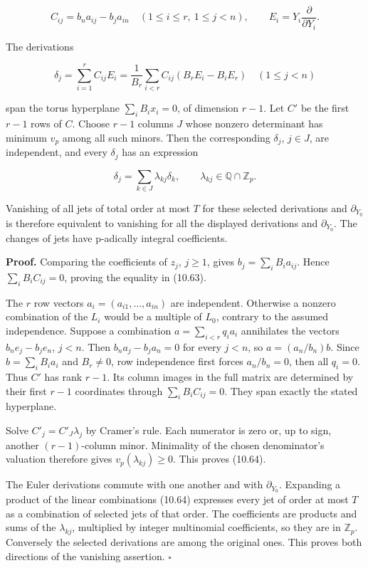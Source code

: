 \documentclass[
  11pt,
  a4paper,
]{article}
\begin{document}
\[
C_{ij}=b_n a_{ij}-b_j a_{in}\quad(1\le i\le r,\ 1\le j<n),
\qquad E_i=Y_i\frac{\partial}{\partial Y_i}.
\tag{10.62}
\]

The derivations

\[
\delta_j=\sum_{i=1}^rC_{ij}E_i
=\frac1{B_r}\sum_{i<r}C_{ij}(B_rE_i-B_iE_r)
\quad(1\le j<n)
\tag{10.63}
\]

span the torus hyperplane \(\sum_iB_i x_i=0\), of dimension \(r-1\). Let
\(C'\) be the first \(r-1\) rows of \(C\). Choose \(r-1\) columns \(J\)
whose nonzero determinant has minimum \(v_p\) among all such minors.
Then the corresponding \(\delta_j\), \(j\in J\), are independent, and
every \(\delta_j\) has an expression

\[
\delta_j=\sum_{k\in J}\lambda_{kj}\delta_k,
\qquad \lambda_{kj}\in\mathbb Q\cap\mathbb Z_p.
\tag{10.64}
\]

Vanishing of all jets of total order at most \(T\) for these selected
derivations and \(\partial_{Y_0}\) is therefore equivalent to vanishing
for all the displayed derivations and \(\partial_{Y_0}\). The changes of
jets have p-adically integral coefficients.

\textbf{Proof.} Comparing the coefficients of \(z_j\), \(j\ge1\), gives
\(b_j=\sum_iB_i a_{ij}\). Hence \(\sum_iB_i C_{ij}=0\), proving the
equality in (10.63).

The \(r\) row vectors \(a_i=(a_{i1},\ldots,a_{in})\) are independent.
Otherwise a nonzero combination of the \(L_i\) would be a multiple of
\(L_0\), contrary to the assumed independence. Suppose a combination
\(a=\sum_{i<r}q_i a_i\) annihilates the vectors \(b_ne_j-b_je_n\),
\(j<n\). Then \(b_n a_j-b_j a_n=0\) for every \(j<n\), so
\(a=(a_n/b_n)b\). Since \(b=\sum_iB_i a_i\) and \(B_r\ne0\), row
independence first forces \(a_n/b_n=0\), then all \(q_i=0\). Thus \(C'\)
has rank \(r-1\). Its column images in the full matrix are determined by
their first \(r-1\) coordinates through \(\sum_iB_i C_{ij}=0\). They
span exactly the stated hyperplane.

Solve \(C'_j=C'_J\lambda_j\) by Cramer's rule. Each numerator is zero
or, up to sign, another \((r-1)\)-column minor. Minimality of the chosen
denominator's valuation therefore gives \(v_p(\lambda_{kj})\ge0\). This
proves (10.64).

The Euler derivations commute with one another and with
\(\partial_{Y_0}\). Expanding a product of the linear combinations
(10.64) expresses every jet of order at most \(T\) as a combination of
selected jets of that order. The coefficients are products and sums of
the \(\lambda_{kj}\), multiplied by integer multinomial coefficients, so
they are in \(\mathbb Z_p\). Conversely the selected derivations are
among the original ones. This proves both directions of the vanishing
assertion. \(\square\)
\end{document}
